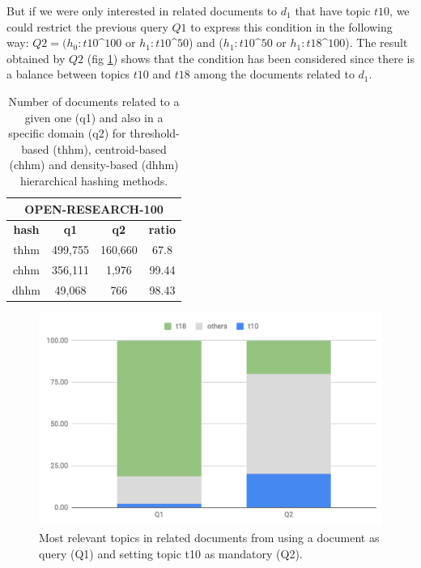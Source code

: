 But if we were only interested in related documents to $d_1$ that have topic $t10$, we could restrict the previous query $Q1$ to express this condition in the following way: $Q2=(h_0:t10$\^{}$100$ or $h_1:t10$\^{}$50$) and ($h_1:t10$\^{}$50$ or $h_1:t18$\^{}$100$). The result obtained by $Q2$ (fig \ref{fig:exploration}) shows that the condition has been considered since there is a balance between topics $t10$ and $t18$ among the documents related to $d_1$.

\begin{table}\centering
\small
\begin{tabular}{ |c||c|c||c|  }
 \hline
 \multicolumn{4}{|c|}{OPEN-RESEARCH-100} \\
 \hline
 \textbf{hash} & \textbf{q1} & \textbf{q2} & \textbf{ratio} \\
 \hline
 thhm & 499,755 & 160,660 & 67.8 \\
 chhm & 356,111 & 1,976 & 99.44  \\
 dhhm & 49,068 & 766 & 98.43 \\
 \hline
\end{tabular}
\caption{Number of documents related to a given one (q1) and also in a specific domain (q2) for threshold-based (thhm), centroid-based (chhm) and density-based (dhhm) hierarchical hashing methods.}
\label{tb:exploration}
\end{table}

\begin{figure}[t]\centering
\includegraphics[scale=0.35]{exploration.png}
\caption{Most relevant topics in related documents from using a document as query (Q1) and setting topic t10 as mandatory (Q2).}
\label{fig:exploration}
\end{figure}


